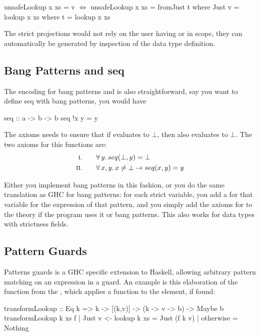 \begin{code}[mathescape]
unsafeLookup x xs = v           $\Leftrightarrow$      unsafeLookup x xs = fromJust t
  where Just v = lookup x xs            where t = lookup x xs
\end{code}

The strict projections would not rely on the user having  or
 in scope, they can automatically be generated by
inspection of the data type definition.

\subsection{Bang Patterns and seq}

The encoding for bang patterns and  is also straightforward,
say you want to define seq with bang patterns, you would have

\begin{code}
seq :: a -> b -> b
seq !x y = y
\end{code}

The axioms needs to ensure that if  evaluates to $\bot$, then
 also evaluates to $\bot$. The two axioms for this functions are:
\begin{align*}
\rom{1} \qquad & \fa{y}    seq(\bot,y) \eq \bot \\
\rom{2} \qquad & \faa{x}{y} x \neq \bot \rightarrow seq(x,y) \eq y
\end{align*}

Either you implement bang patterns in this fashion, or you do the same
translation as GHC for bang patterns: for each strict variable, you
add a  for that variable for the expression of that pattern,
and you simply add the axioms for  to the theory if the
program uses it or bang patterns. This also works for data types with
strictness fields.

\subsection{Pattern Guards}

Patterns guards is a GHC specific extension to Haskell, allowing
arbitrary pattern matching on an expression in a guard. An example is
this elaboration of the  function from the ,
which applies a function to the element, if found:

\begin{code}
transformLookup :: Eq k => k -> [(k,v)] -> (k -> v -> b) -> Maybe b
transformLookup k xs f | Just v <- lookup k xs = Just (f k v)
                       | otherwise             = Nothing
\end{code}

